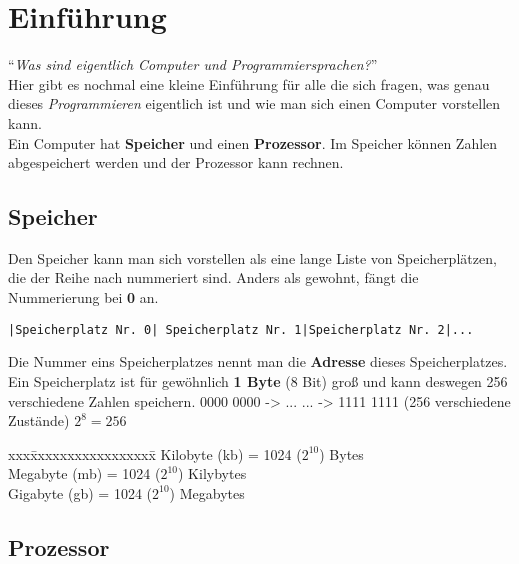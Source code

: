 \documentclass[c_worksheet.tex]{subfiles}
\begin{document}
\chapter{Einführung}

``\textit{Was sind eigentlich Computer und Programmiersprachen?}''\\
Hier gibt es nochmal eine kleine Einführung für alle die sich fragen, was genau dieses \textit{Programmieren} eigentlich ist und wie man sich einen Computer vorstellen kann.\\
Ein Computer hat \textbf{Speicher} und einen \textbf{Prozessor}. Im Speicher können Zahlen abgespeichert werden und der Prozessor kann rechnen. \\

\section{Speicher}

Den Speicher kann man sich vorstellen als eine lange Liste von Speicherplätzen, die der Reihe nach nummeriert sind. Anders als gewohnt, fängt die Nummerierung bei \textbf{0} an. \\

\begin{lstlisting}[numbers=none, backgroundcolor=\color{lightgray}, frame=lrtb]
|Speicherplatz Nr. 0| Speicherplatz Nr. 1|Speicherplatz Nr. 2|...
\end{lstlisting}

\vspace{3pt}
Die Nummer eins Speicherplatzes nennt man die \textbf{Adresse} dieses Speicherplatzes. \\
Ein Speicherplatz ist für gewöhnlich \textbf{1 Byte} (8 Bit) groß und kann deswegen 256 verschiedene Zahlen speichern.
0000 0000 -> ...  ... -> 1111 1111 (256 verschiedene Zustände) $2^8 = 256$ \\

\begin{tabbing}
xxx\=xxxxxxxxxxxxxxxxx\=  \kill
{} Kilobyte (kb) \>= 1024 ($2^{10}$) Bytes\\
 Megabyte (mb) \>= 1024 ($2^{10}$) Kilybytes\\
 Gigabyte (gb) \>= 1024 ($2^{10}$) Megabytes\\
\end{tabbing}

\newpage
\section{Prozessor}
\end{document}
